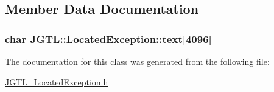 \subsection{Member Data Documentation}
\hypertarget{class_j_g_t_l_1_1_located_exception_db8c3af227f50afffa775e69fe82b096}{
\subsubsection[text]{\setlength{\rightskip}{0pt plus 5cm}char \hyperlink{class_j_g_t_l_1_1_located_exception_db8c3af227f50afffa775e69fe82b096}{JGTL::Located\-Exception::text}\mbox{[}4096\mbox{]}}}
\label{class_j_g_t_l_1_1_located_exception_db8c3af227f50afffa775e69fe82b096}




The documentation for this class was generated from the following file:\begin{CompactItemize}
\item 
\hyperlink{_j_g_t_l___located_exception_8h}{JGTL\_\-Located\-Exception.h}\end{CompactItemize}
